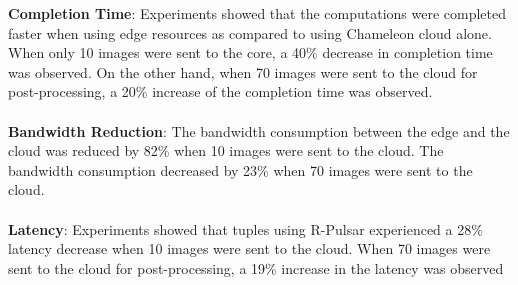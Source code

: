 
\noindent\textbf{Completion Time}: Experiments showed that the computations were completed faster when using edge resources as compared to using Chameleon cloud alone. When only 10 images were sent to the core, a 40\% decrease in completion time was observed. On the other hand, when 70 images were sent to the cloud for post-processing, a 20\% increase of the completion time was observed.
\\\\
\textbf{Bandwidth Reduction}: The bandwidth consumption between the edge and the cloud was reduced by 82\% when 10 images were sent to the cloud. The bandwidth consumption decreased by 23\% when 70 images were sent to the cloud.
\\\\
\textbf{Latency}: Experiments showed that tuples using R-Pulsar experienced a 28\% latency decrease when 10 images were sent to the cloud. When 70 images were sent to the cloud for post-processing, a 19\% increase in the latency was observed